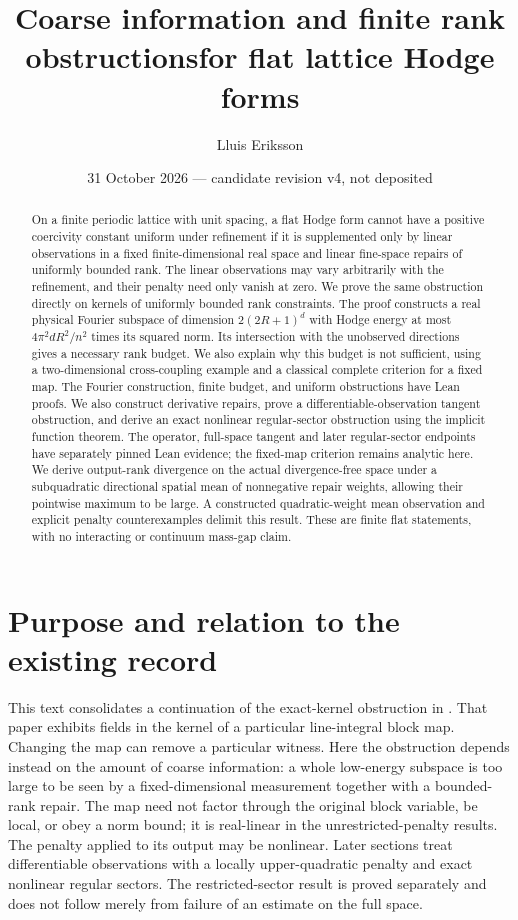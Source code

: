 \documentclass[11pt]{article}
\title{Coarse information and finite rank obstructions\newline for flat lattice Hodge forms}
\author{Lluis Eriksson}
\date{31 October 2026 --- candidate revision v4, not deposited}
\begin{document}
\maketitle
\begin{abstract}
On a finite periodic lattice with unit spacing, a flat Hodge form cannot have
a positive coercivity constant uniform under refinement if it is supplemented
only by linear observations in a fixed finite-dimensional real space and
linear fine-space repairs of uniformly bounded rank. The linear observations
may vary arbitrarily with the
refinement, and their penalty need only vanish at zero. We prove the same
obstruction directly on kernels of uniformly bounded rank constraints.
The proof constructs a real physical Fourier subspace of dimension
$2(2R+1)^d$ with Hodge energy at most $4\pi^2dR^2/n^2$ times its squared norm.
Its intersection with the unobserved directions gives a necessary rank budget.
We also explain why this budget is not sufficient, using a two-dimensional
cross-coupling example and a classical complete criterion for a fixed map.
The Fourier construction, finite budget, and uniform obstructions have Lean
proofs. We also construct derivative repairs, prove a differentiable-observation tangent obstruction, and derive an exact nonlinear regular-sector obstruction using the implicit function theorem. The operator, full-space tangent and later regular-sector endpoints have separately pinned Lean evidence; the fixed-map criterion remains analytic here. We derive output-rank divergence on the actual divergence-free space under a subquadratic directional spatial mean of nonnegative repair weights, allowing their pointwise maximum to be large. A constructed quadratic-weight mean observation and explicit penalty counterexamples delimit this result. These are finite
flat statements, with no interacting or continuum mass-gap claim.
\end{abstract}

\section{Purpose and relation to the existing record}
This text consolidates a continuation of the exact-kernel obstruction in
\cite{eriksson}. That paper exhibits fields in the kernel of a particular
line-integral block map. Changing the map can remove a particular witness.
Here the obstruction depends instead on the amount of coarse information:
a whole low-energy subspace is too large to be seen by a fixed-dimensional
measurement together with a bounded-rank repair. The map need not factor
through the original block variable, be local, or obey a norm bound; it is
real-linear in the unrestricted-penalty results. The penalty applied to its output may be nonlinear. Later sections treat differentiable observations with a locally upper-quadratic penalty and exact nonlinear regular sectors.
The restricted-sector result is proved separately and does not follow merely
from failure of an estimate on the full space.
\end{document}

